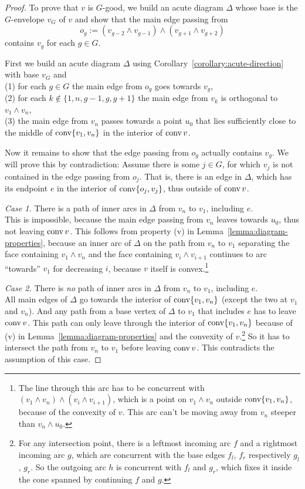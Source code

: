 \begin{proof}
  To prove that $v$ is $G$-good, we build an acute diagram $\Delta$ whose base is the $G$-envelope $v_G$ of $v$ and show that the main edge passing from $$o_g := (v_{g-2} \wedge v_{g-1}) \wedge (v_{g+1} \wedge v_{g+2})$$ contains $v_g$ for each $g \in G$.

  First we build an acute diagram $\Delta$ using Corollary~\ref{corollary:acute-direction} with base $v_G$ and\\
  (1) for each $g \in G$ the main edge from $o_g$ goes towards $v_g$,\\
  (2) for each $k \notin \{1,n,g-1,g,g+1\}$ the main edge from $v_k$ is orthogonal to $v_1 \wedge v_n$,\\
  (3) the main edge from $v_n$ passes towards a point $u_0$ that lies sufficiently close to the middle of $\operatorname{conv} \{v_1,v_n\}$ in the interior of $\operatorname{conv} v$.

  Now it remains to show that the edge passing from $o_g$ actually contains $v_g$. We will prove this by contradiction: Assume there is some $j \in G$, for which $v_j$ is not contained in the edge passing from $o_j$. That is, there is an edge in $\Delta$, which has its endpoint $e$ in the interior of $\operatorname{conv} \{o_j, v_j\}$, thus outside of $\operatorname{conv} v$.

  \textit{Case 1.} There is a path of inner arcs in $\Delta$ from $v_n$ to $v_1$, including $e$.\\
  This is impossible, because the main edge passing from $v_n$ leaves towards $u_0$, thus not leaving $\operatorname{conv} v$. This follows from property (v) in Lemma~\ref{lemma:diagram-properties}, because an inner arc of $\Delta$ on the path from $v_n$ to $v_1$ separating the face containing $v_1 \wedge v_n$ and the face containing $v_i \wedge v_{i+1}$ continues to arc ``towards'' $v_1$ for decreasing $i$, because $v$ itself is convex.\footnote{The line through this arc has to be concurrent with $(v_1 \wedge v_n) \wedge (v_i \wedge v_{i+1})$, which is a point on $v_1 \wedge v_n$ outside $\operatorname{conv} \{v_1,v_n\}$, because of the convexity of $v$. This arc can't be moving away from $v_n$ steeper than $v_n \wedge u_0$.}

  \textit{Case 2.} There is \emph{no} path of inner arcs in $\Delta$ from $v_n$ to $v_1$, including $e$.\\
  All main edges of $\Delta$ go towards the interior of $\operatorname{conv} \{v_1, v_n\}$ (except the two at $v_1$ and $v_n$). And any path from a base vertex of $\Delta$ to $v_1$ that includes $e$ has to leave $\operatorname{conv} v$. This path can only leave through the interior of $\operatorname{conv}\{v_1,v_n\}$ because of (v) in Lemma~\ref{lemma:diagram-properties} and the convexity of $v$.\footnote{For any intersection point, there is a leftmost incoming arc $f$ and a rightmost incoming arc $g$, which are concurrent with the base edges $f_l$, $f_r$ respectively $g_l$, $g_r$. So the outgoing arc $h$ is concurrent with $f_l$ and $g_r$, which fixes it inside the cone spanned by continuing $f$ and $g$.}
  So it has to intersect the path from $v_n$ to $v_1$ before leaving $\operatorname{conv} v$. This contradicts the assumption of this case.


\end{proof}
